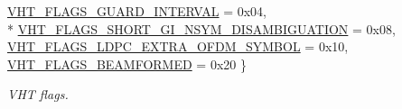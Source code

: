 \begin{DoxyCompactItemize}
\hyperlink{classns3_1_1RadiotapHeader_a6df30f9a6b9d20263a6e5531377eed5caf6d5b32fb7e1c0b442c7d4b6c8dc944e}{V\+H\+T\+\_\+\+F\+L\+A\+G\+S\+\_\+\+G\+U\+A\+R\+D\+\_\+\+I\+N\+T\+E\+R\+V\+AL} = 0x04, 
\\*
\hyperlink{classns3_1_1RadiotapHeader_a6df30f9a6b9d20263a6e5531377eed5caff253e72080c487200f28db926157163}{V\+H\+T\+\_\+\+F\+L\+A\+G\+S\+\_\+\+S\+H\+O\+R\+T\+\_\+\+G\+I\+\_\+\+N\+S\+Y\+M\+\_\+\+D\+I\+S\+A\+M\+B\+I\+G\+U\+A\+T\+I\+ON} = 0x08, 
\hyperlink{classns3_1_1RadiotapHeader_a6df30f9a6b9d20263a6e5531377eed5ca58b9b408671364ba382c56778fd5d94c}{V\+H\+T\+\_\+\+F\+L\+A\+G\+S\+\_\+\+L\+D\+P\+C\+\_\+\+E\+X\+T\+R\+A\+\_\+\+O\+F\+D\+M\+\_\+\+S\+Y\+M\+B\+OL} = 0x10, 
\hyperlink{classns3_1_1RadiotapHeader_a6df30f9a6b9d20263a6e5531377eed5cae63a380138b211ecf089c7f969896aaa}{V\+H\+T\+\_\+\+F\+L\+A\+G\+S\+\_\+\+B\+E\+A\+M\+F\+O\+R\+M\+ED} = 0x20
 \}\begin{DoxyCompactList}\small\item\em V\+HT flags. \end{DoxyCompactList}
\end{DoxyCompactItemize}
